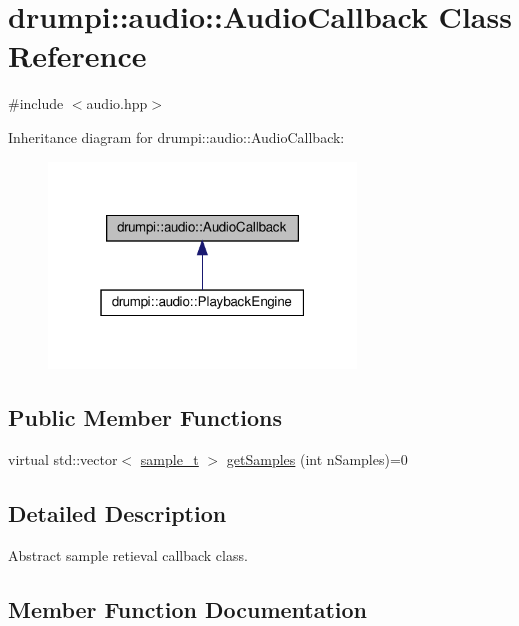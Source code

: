 \hypertarget{classdrumpi_1_1audio_1_1AudioCallback}{}\section{drumpi\+:\+:audio\+:\+:Audio\+Callback Class Reference}
\label{classdrumpi_1_1audio_1_1AudioCallback}


{\ttfamily \#include $<$audio.\+hpp$>$}



Inheritance diagram for drumpi\+:\+:audio\+:\+:Audio\+Callback\+:
\nopagebreak
\begin{figure}[H]
\begin{center}
\leavevmode
\includegraphics[width=232pt]{classdrumpi_1_1audio_1_1AudioCallback__inherit__graph}
\end{center}
\end{figure}
\subsection*{Public Member Functions}
\begin{DoxyCompactItemize}
\item 
virtual std\+::vector$<$ \hyperlink{namespacedrumpi_1_1audio_aca0bdc9164f87b72057e284442abab6e}{sample\+\_\+t} $>$ \hyperlink{classdrumpi_1_1audio_1_1AudioCallback_a9f53a830e6fd3d8eecf6f6ebb27314cd}{get\+Samples} (int n\+Samples)=0
\end{DoxyCompactItemize}


\subsection{Detailed Description}
Abstract sample retieval callback class. 

\subsection{Member Function Documentation}
\mbox{\label{classdrumpi_1_1audio_1_1AudioCallback_a9f53a830e6fd3d8eecf6f6ebb27314cd}} 
